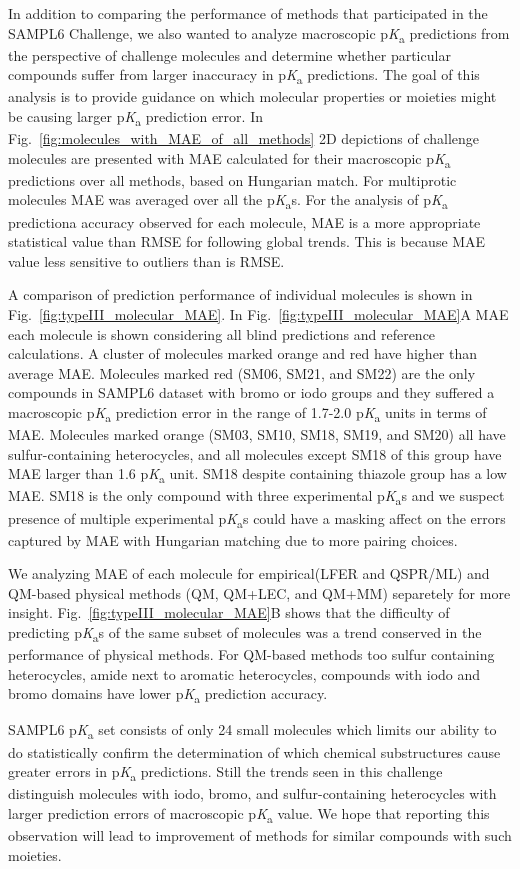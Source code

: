 \documentclass[9pt,lineno,final]{elife}
\newcommand{\pKa}{p\textit{K}\textsubscript{a}}
\begin{document}
In addition to comparing the performance of methods that participated in the SAMPL6 Challenge, we also wanted to analyze macroscopic \pKa{} predictions from the perspective of challenge molecules and determine whether particular compounds suffer from larger inaccuracy in \pKa{} predictions. 
The goal of this analysis is to provide guidance on which molecular properties or moieties might be causing larger \pKa{} prediction error.
In Fig.~\ref{fig:molecules_with_MAE_of_all_methods} 2D depictions of challenge molecules are presented with MAE calculated for their macroscopic \pKa{} predictions over all methods, based on Hungarian match. For multiprotic molecules MAE was averaged over all the \pKa{}s. For the analysis of \pKa{} predictiona accuracy observed for each molecule, MAE is a more appropriate statistical value than RMSE for following global trends. This is because MAE value less sensitive to outliers than is RMSE.


A comparison of prediction performance of individual molecules is shown in Fig.~\ref{fig:typeIII_molecular_MAE}. In Fig.~\ref{fig:typeIII_molecular_MAE}A MAE each molecule is shown  considering all blind predictions and reference calculations. A cluster of molecules marked orange and red have higher than average MAE. 
Molecules marked red (SM06, SM21, and SM22) are the only compounds in SAMPL6 dataset with bromo or iodo groups and they suffered a macroscopic \pKa{} prediction error in the range of 1.7-2.0 \pKa{} units in terms of MAE.
Molecules marked orange (SM03, SM10, SM18, SM19, and SM20) all have sulfur-containing heterocycles, and all molecules except SM18 of this group have MAE larger than 1.6 \pKa{} unit.
SM18 despite containing thiazole group has a low MAE. SM18 is the only compound with three experimental \pKa{}s and we suspect presence of multiple experimental \pKa{}s could have a masking affect on the errors captured by MAE with Hungarian matching due to more pairing choices.

We analyzing MAE of each molecule for empirical(LFER and QSPR/ML) and QM-based physical methods (QM, QM+LEC, and QM+MM) separetely for more insight. 
Fig.~\ref{fig:typeIII_molecular_MAE}B shows that the difficulty of predicting \pKa{}s of the same subset of molecules was a trend conserved in the performance of physical methods. For QM-based methods too sulfur containing heterocycles, amide next to aromatic heterocycles, compounds with iodo and bromo domains have lower \pKa{} prediction accuracy.

SAMPL6 \pKa{} set consists of only 24 small molecules which limits our ability to do statistically confirm the determination of which chemical substructures cause greater errors in \pKa{} predictions. Still the trends seen in this challenge distinguish molecules with iodo, bromo, and sulfur-containing heterocycles with larger prediction errors of macroscopic \pKa{} value. We hope that reporting this observation will lead to improvement of methods for similar compounds with such moieties. 
\end{document}
